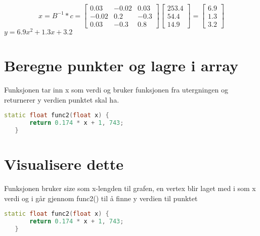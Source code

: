 \documentclass[a4paper,norsk]{article}
\begin{document}
\begin{equation*}
x = B^{-1} * c = \begin{bmatrix} 0.03 & -0.02 & 0.03 \\ -0.02 & 0.2 & -0.3 \\ 0.03 & -0.3 & 0.8 \end{bmatrix}\begin{bmatrix} 253.4 \\ 54.4 \\ 14.9\end{bmatrix}
= \begin{bmatrix}6.9 \\ 1.3 \\ 3.2 \end{bmatrix}
\end{equation*}
$y = 6.9x^{2}+1.3x+3.2$
\section{Beregne punkter og lagre i array}
Funksjonen tar inn x som verdi og bruker funksjonen fra utergningen og returnerer y verdien punktet skal ha.
\begin{lstlisting}[language=C++, caption={trianglesurface.h}]
static float func2(float x) {
       return 0.174 * x + 1, 743;
   }
\end{lstlisting}
\section{Visualisere dette}
Funksjonen bruker size som x-lengden til grafen, en vertex blir laget med i som x verdi og i går gjennom func2() til å finne y verdien til punktet
\begin{lstlisting}[language=C++, caption={trianglesurface.h}]
static float func2(float x) {
       return 0.174 * x + 1, 743;
   }
\end{lstlisting}
\end{document}
